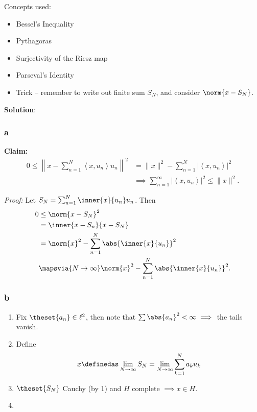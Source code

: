 \begin{solution}

Concepts used:

\begin{itemize}
\tightlist
\item
  Bessel's Inequality
\item
  Pythagoras
\item
  Surjectivity of the Riesz map
\item
  Parseval's Identity
\item
  Trick -- remember to write out finite sum \(S_N\), and consider
  \(\norm{x - S_N}\).
\end{itemize}

\textbf{Solution}:

\hypertarget{a-20}{%
\subsubsection{a}\label{a-20}}

\textbf{Claim:}
\begin{align*}
0 \leq \left\|x-\sum_{n=1}^{N}\left\langle x, u_{n}\right\rangle u_{n}\right\|^{2}
&= \|x\|^{2}-\sum_{n=1}^{N}\left|\left\langle x, u_{n}\right\rangle\right|^{2} \\ 
&\implies
\sum_{n=1}^{\infty}\left|\left\langle x, u_{n}\right\rangle\right|^{2} \leq\|x\|^{2}
.\end{align*}

\emph{Proof:} Let \(S_N = \sum_{n=1}^N \inner{x}{u_n} u_n\). Then
\begin{align*}
0 
&\leq \norm{x - S_N}^2 \\ 
&= \inner{x - S_n}{x - S_N} \\
&= \norm{x}^2 - \sum_{n=1}^N \abs{\inner{x}{u_n}}^2 \\
&\mapsvia{N\to\infty} \norm{x}^2 - \sum_{n=1}^N \abs{\inner{x}{u_n}}^2
.\end{align*}

\hypertarget{b-19}{%
\subsubsection{b}\label{b-19}}

\begin{enumerate}
\def\labelenumi{\arabic{enumi}.}
\item
  Fix \(\theset{a_n} \in \ell^2\), then note that
  \(\sum \abs{a_n}^2 < \infty \implies\) the tails vanish.
\item
  Define
  \begin{align*}
  x \definedas \displaystyle\lim_{N\to\infty} S_N = \lim_{N\to \infty} \sum_{k=1}^N a_k u_k
  \end{align*}
\item
  \(\theset{S_N}\) Cauchy (by 1) and \(H\) complete \(\implies x\in H\).
\item


\end{enumerate}
\end{solution}
